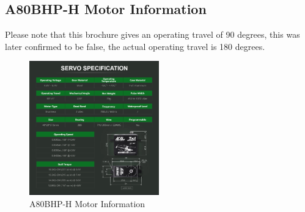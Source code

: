 \subsection{A80BHP-H Motor Information}
\label{appendix:A80_motor_info}

Please note that this brochure gives an operating travel of 90 degrees, this was later confirmed to be false, the actual operating travel is 180 degrees.
\begin{figure}[H]
    \centering
    \includegraphics[width=0.5\textwidth]{Images/A80_motor_info.png}
    \caption{A80BHP-H Motor Information}
    \label{fig:A80_motor_info}
\end{figure}